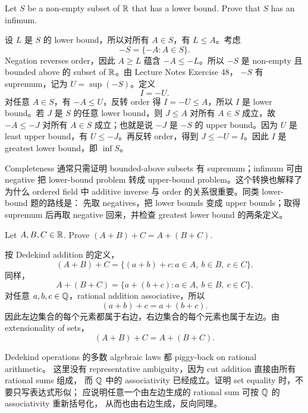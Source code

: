 \begin{exerciseblock}
Let \(S\) be a non-empty subset of \(\mathbb{R}\) that has a lower bound. Prove that
\(S\) has an infimum.
\end{exerciseblock}

\begin{solution}
设 \(L\) 是 \(S\) 的 lower bound，所以对所有 \(A\in S\)，有 \(L\leq A\)。考虑
\[
  -S=\{-A:A\in S\}.
\]
Negation reverses order，因此 \(A\geq L\) 蕴含 \(-A\leq -L\)。所以 \(-S\) 是
non-empty 且 bounded above 的 subset of \(\mathbb{R}\)。由 Lecture Notes Exercise 48，
\(-S\) 有 supremum，记为 \(U=\sup(-S)\)。定义
\[
  I=-U.
\]
对任意 \(A\in S\)，有 \(-A\leq U\)，反转 order 得 \(I=-U\leq A\)，所以 \(I\) 是
lower bound。若 \(J\) 是 \(S\) 的任意 lower bound，则 \(J\leq A\) 对所有
\(A\in S\) 成立，故 \(-A\leq -J\) 对所有 \(A\in S\) 成立；也就是说 \(-J\) 是
\(-S\) 的 upper bound。因为 \(U\) 是 least upper bound，有 \(U\leq -J\)。再反转
order，得到 \(J\leq -U=I\)。因此 \(I\) 是 greatest lower bound，即
\(\inf S\)。
\end{solution}

\begin{explanation}
Completeness 通常只需证明 bounded-above subsets 有 supremum；infimum 可由 negative
把 lower-bound problem 转成 upper-bound problem。这个转换也解释了为什么 ordered
field 中 additive inverse 与 order 的关系很重要。同类 lower-bound 题的路线是：
先取 negatives，把 lower bounds 变成 upper bounds；取得 supremum 后再取 negative
回来，并检查 greatest lower bound 的两条定义。
\end{explanation}

\begin{exerciseblock}
Let \(A,B,C\in\mathbb{R}\). Prove \((A+B)+C=A+(B+C)\).
\end{exerciseblock}

\begin{solution}
按 Dedekind addition 的定义，
\[
  (A+B)+C
  =\{(a+b)+c:a\in A,\ b\in B,\ c\in C\}.
\]
同样，
\[
  A+(B+C)
  =\{a+(b+c):a\in A,\ b\in B,\ c\in C\}.
\]
对任意 \(a,b,c\in\mathbb{Q}\)，rational addition associative，所以
\[
  (a+b)+c=a+(b+c).
\]
因此左边集合的每个元素都属于右边，右边集合的每个元素也属于左边。由 extensionality
of sets，
\[
  (A+B)+C=A+(B+C).
\]
\end{solution}

\begin{explanation}
Dedekind operations 的多数 algebraic laws 都 piggy-back on rational arithmetic。
这里没有 representative ambiguity，因为 cut addition 直接由所有 rational sums 组成，
而 \(\mathbb{Q}\) 中的 associativity 已经成立。证明 set equality 时，不要只写表达式形似；
应说明任意一个由左边生成的 rational sum 可按 \(\mathbb{Q}\) 的 associativity 重新括号化，
从而也由右边生成，反向同理。
\end{explanation}

